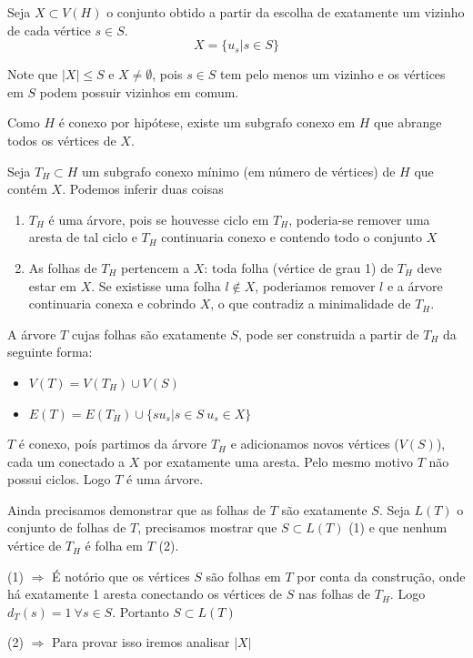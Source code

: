 \documentclass[12pt, a4paper]{article}
\begin{document}
  Seja $X \subset V(H)$ o conjunto obtido a partir da escolha de exatamente
  um vizinho de cada vértice $s \in S$.
  $$X = \{u_s | s \in S\}$$

  Note que $|X| \le S$ e $X \ne \emptyset$, pois $s \in S$ tem pelo menos
  um vizinho e os vértices em $S$ podem possuir vizinhos em comum.

  Como $H$ é conexo por hipótese, existe um subgrafo conexo em $H$ que abrange
  todos os vértices de $X$.

  Seja $T_H \subset H$ um subgrafo conexo mínimo (em número de vértices) de $H$
  que contém $X$. Podemos inferir duas coisas

  \begin{enumerate}
    \item $T_H$ é uma árvore, pois se houvesse ciclo em $T_H$, poderia-se
remover uma aresta de tal ciclo e $T_H$ continuaria conexo e contendo todo
o conjunto $X$
    \item As folhas de $T_H$ pertencem a $X$: toda folha (vértice de grau 1)
    de $T_H$ deve estar em $X$. Se existisse uma folha $l \notin X$, poderiamos
    remover $l$ e a árvore continuaria conexa e cobrindo $X$, o que contradiz
    a minimalidade de $T_H$.
  \end{enumerate}

  A árvore $T$ cujas folhas são exatamente $S$, pode ser construida a partir de
  $T_H$ da seguinte forma:

  \begin{itemize}
    \item $V(T) = V(T_H) \cup V(S)$
    \item $E(T) = E(T_H) \cup \{su_s | s \in S \ u_s \in X\}$
  \end{itemize}
  $T$ é conexo, poís partimos da árvore $T_H$ e adicionamos novos vértices
  ($V(S)$), cada um conectado a $X$ por exatamente uma aresta. Pelo mesmo
  motivo $T$ não possui ciclos. Logo $T$ é uma árvore.

  Ainda precisamos demonstrar que as folhas de $T$ são exatamente $S$.
  Seja $L(T)$ o conjunto de folhas de $T$, precisamos mostrar que 
  $S \subset L(T)$ (1) e que nenhum vértice de $T_H$ é folha em $T$ (2).

  (1) $\Rightarrow$ É notório que os vértices $S$ são folhas em $T$ por conta
  da construção, onde há exatamente 1 aresta conectando os vértices de $S$
  nas folhas de $T_H$. Logo $d_T(s) = 1\ \forall s \in S$. Portanto $S \subset L(T)$  

  (2) $\Rightarrow$ Para provar isso iremos analisar $|X|$
\end{document}
